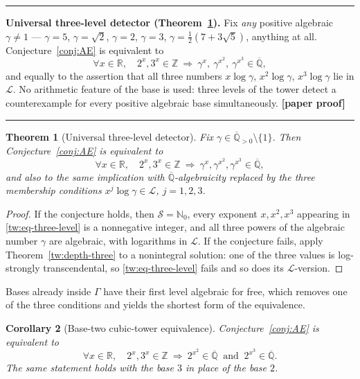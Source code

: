 \documentclass[11pt,oneside]{article}
\newtheorem{theorem}{Theorem}[section]
\newtheorem{corollary}[theorem]{Corollary}
\theoremstyle{definition}
\theoremstyle{remark}
\newcommand{\Nzero}{\mathbb N_0}
\newcommand{\Z}{\mathbb Z}
\newcommand{\R}{\mathbb R}
\newcommand{\Abar}{\overline{\mathbb Q}}
\newcommand{\Sol}{\mathcal S}
\newcommand{\Apos}{\Abar_{>0}}
\newcommand{\LL}{\mathcal L}
\newcommand{\GammaSat}{\Gamma}
\newcommand{\statusnew}{\textcolor{newgreen}{\textbf{[paper proof]}}}
\newenvironment{resultbox}
{\begin{center}\begin{minipage}{0.94\textwidth}\hrule\vspace{0.45em}}
{\vspace{0.35em}\hrule\end{minipage}\end{center}}
\begin{document}
\begin{resultbox}
\textbf{Universal three-level detector (Theorem~\ref{tw:universal-detector}).}
Fix \emph{any} positive algebraic $\gamma\ne1$ --- $\gamma=5$, $\gamma=\sqrt2$, $\gamma=2$,
$\gamma=3$, $\gamma=\tfrac12(7+3\sqrt5)$, anything at all.  Conjecture~\ref{conj:AE} is
equivalent to
\[
 \forall x\in\R,\quad 2^x,3^x\in\Z
 \ \Longrightarrow\
 \gamma^x,\ \gamma^{x^2},\ \gamma^{x^3}\in\Abar,
\]
and equally to the assertion that all three numbers $x\log\gamma$, $x^2\log\gamma$,
$x^3\log\gamma$ lie in $\LL$.  No arithmetic feature of the base is used: three levels of the
tower detect a counterexample for every positive algebraic base simultaneously. \statusnew
\end{resultbox}

\begin{theorem}[Universal three-level detector]
\label{tw:universal-detector}
Fix $\gamma\in\Apos\setminus\{1\}$.  Then Conjecture~\ref{conj:AE} is equivalent to
\begin{equation}
 \forall x\in\R,\quad
 2^x,3^x\in\Z
 \ \Longrightarrow\
 \gamma^x,\gamma^{x^2},\gamma^{x^3}\in\Abar,
 \label{tw:eq-three-level}
\end{equation}
and also to the same implication with $\Abar$-algebraicity replaced by the three membership
conditions $x^j\log\gamma\in\LL$, $j=1,2,3$.
\end{theorem}

\begin{proof}
If the conjecture holds, then $\Sol=\Nzero$, every exponent $x,x^2,x^3$ appearing in
\eqref{tw:eq-three-level} is a nonnegative integer, and all three powers of the algebraic
number $\gamma$ are algebraic, with logarithms in $\LL$.  If the conjecture fails, apply
Theorem~\ref{tw:depth-three} to a nonintegral solution: one of the three values is log-strongly
transcendental, so \eqref{tw:eq-three-level} fails and so does its $\LL$-version.
\end{proof}

Bases already inside $\GammaSat$ have their first level algebraic for free, which removes one
of the three conditions and yields the shortest form of the equivalence.

\begin{corollary}[Base-two cubic-tower equivalence]
\label{tw:base2-equivalence}
Conjecture~\ref{conj:AE} is equivalent to
\begin{equation}
 \forall x\in\R,\quad
 2^x,3^x\in\Z
 \ \Longrightarrow\
 2^{x^2}\in\Abar\ \text{ and }\ 2^{x^3}\in\Abar .
 \label{tw:eq-base2-cubic}
\end{equation}
The same statement holds with the base $3$ in place of the base $2$.
\end{corollary}
\end{document}

